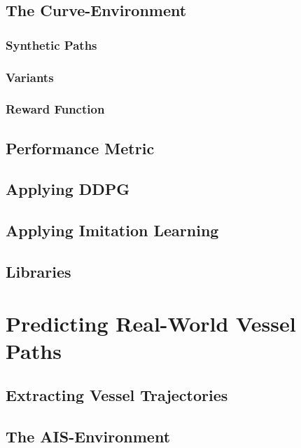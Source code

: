     \subsection{The Curve-Environment}
        
        \subsubsection{Synthetic Paths}
        
        \subsubsection{Variants}
        
        \subsubsection{Reward Function}\label{subchap:reward}
        
        
    \subsection{Performance Metric}
    
    \subsection{Applying DDPG}
    
    \newpage
    \subsection{Applying Imitation Learning} \label{subchap:applyBC}
    
    \subsection{Libraries}
    
    
\newpage
\section{Predicting Real-World Vessel Paths}\label{chap:realworld}

    \subsection{Extracting Vessel Trajectories}
    
    \subsection{The AIS-Environment}
    
